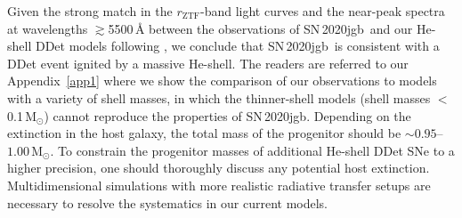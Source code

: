 \documentclass[twocolumn]{aastex631}
\newcommand{\sn}{SN\,2020jgb}
\newcommand{\Msun}{\mathrm{M_\odot}}
\begin{document}
Given the strong match in the $r_\mathrm{ZTF}$-band light curves and the near-peak spectra at wavelengths $\gtrsim$5500\,\r{A} between the observations of \sn\ and our He-shell DDet models following \citet{polin_observational_2019}, we conclude that \sn\ is consistent with a DDet event ignited by a massive He-shell. The readers are referred to our Appendix~\ref{app1} where we show the comparison of our observations to models with a variety of shell masses, in which the thinner-shell models (shell masses $<$0.1\,$\Msun$) cannot reproduce the properties of \sn. Depending on the extinction in the host galaxy, the total mass of the progenitor should be $\sim$$0.95$--$1.00\,\Msun$. To constrain the progenitor masses of additional He-shell DDet SNe to a higher precision, one should thoroughly discuss any potential host extinction. Multidimensional simulations with more realistic radiative transfer setups are necessary to resolve the systematics in our current models.
\end{document}
